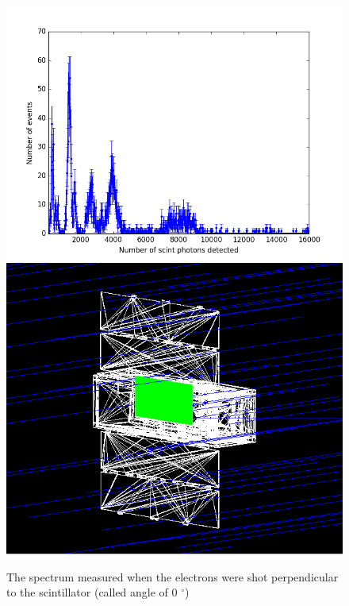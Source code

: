 \documentclass[12pt, a4paper,titlepage]{article}
\numberwithin{equation}{section}
\numberwithin{figure}{section}
\begin{document}
\begin{figure}[h!]
 \centering %
 \includegraphics[width=.55\textwidth,origin=c,angle=0]{images/electrons0degspectra.png}
 \qquad
 \includegraphics[width=.4\textwidth,origin=c,angle=90]{images/0mac.png} 
 \caption{\label{fig:i} The spectrum measured when the electrons were shot perpendicular to the scintillator (called angle of 0 $^{\circ}$)}
 \end{figure}
\end{document}
